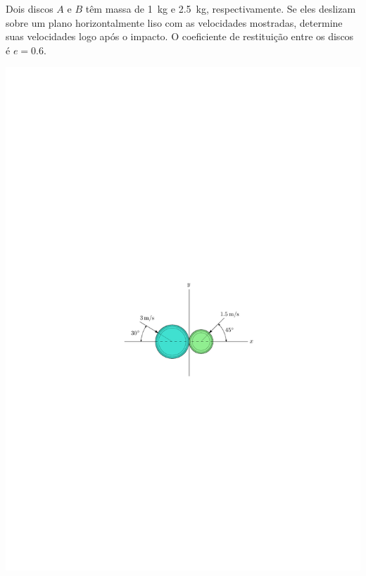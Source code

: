 \item Dois discos $A$ e $B$ têm massa de \SI{1}{\kilogram} e \SI{2.5}{\kilogram}, respectivamente. Se eles deslizam sobre um plano horizontalmente liso com as velocidades mostradas, determine suas velocidades logo após o impacto.
O coeficiente de restituição entre os discos é $e=0.6$.

\begin{flushright}
	\includegraphics[scale=1.3]{images/draw_3}
\end{flushright}